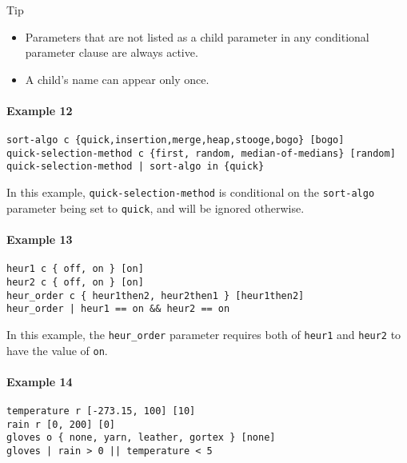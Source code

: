 \documentclass[manual.tex]{subfiles}
\begin{document}
\begin{bclogo}[logo=\bclampe, couleurBarre=red, noborder=true]{Tip}
\begin{itemize}
\item Parameters that are not listed as a child parameter in any conditional parameter clause are always active.
\item A child's name can appear only once.
\end{itemize}
\end{bclogo}



\paragraph{Example 12}

\begin{verbatim}
sort-algo c {quick,insertion,merge,heap,stooge,bogo} [bogo]
quick-selection-method c {first, random, median-of-medians} [random]
quick-selection-method | sort-algo in {quick}
\end{verbatim}
In this example, \texttt{quick-selection-method} is conditional on the \texttt{sort-algo} parameter being set to \texttt{quick}, and will be ignored otherwise.

\paragraph{Example 13}

\begin{verbatim}
heur1 c { off, on } [on]
heur2 c { off, on } [on]
heur_order c { heur1then2, heur2then1 } [heur1then2]
heur_order | heur1 == on && heur2 == on
\end{verbatim}

In this example, the \texttt{heur\_order} parameter requires both of \texttt{heur1} and \texttt{heur2} to have the value of \texttt{on}.

\paragraph{Example 14}
\begin{verbatim}
temperature r [-273.15, 100] [10]
rain r [0, 200] [0]
gloves o { none, yarn, leather, gortex } [none]
gloves | rain > 0 || temperature < 5
\end{verbatim}
\end{document}
